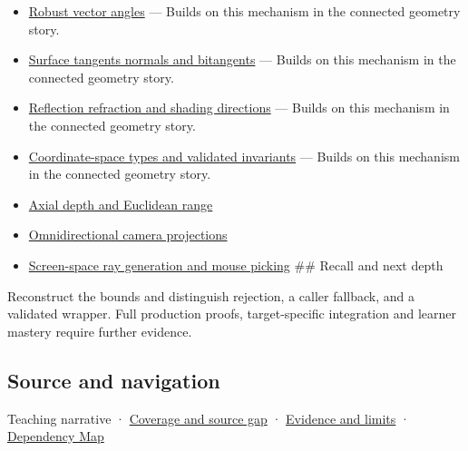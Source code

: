 \begin{itemize}
\item
  \hyperref[appendix-e569e60e18e6]{Robust vector angles} --- Builds on this mechanism in the connected geometry story.
\item
  \hyperref[appendix-e31893dec985]{Surface tangents normals and bitangents} --- Builds on this mechanism in the connected geometry story.
\item
  \hyperref[appendix-44e00863b4d5]{Reflection refraction and shading directions} --- Builds on this mechanism in the connected geometry story.
\item
  \hyperref[appendix-380a220e2529]{Coordinate-space types and validated invariants} --- Builds on this mechanism in the connected geometry story.
\item
  \hyperref[appendix-cac01ebeeb11]{Axial depth and Euclidean range}
\item
  \hyperref[appendix-fc99ad39f351]{Omnidirectional camera projections}
\item
  \hyperref[appendix-f1a6d43e80d1]{Screen-space ray generation and mouse picking} \#\# Recall and next depth
\end{itemize}

Reconstruct the bounds and distinguish rejection, a caller fallback, and a validated wrapper. Full production proofs, target-specific integration and learner mastery require further evidence.

\subsection{Source and navigation}\label{appendix-f744e41b95b4-source-and-navigation}

{Teaching narrative} · \hyperref[appendix-fd090d982a15-phase-6---parts-501-600]{Coverage and source gap} · \hyperref[appendix-a103e7846d21-phase-6---source-analysis-and-verification]{Evidence and limits} · \hyperref[appendix-4ad47bdd269a]{Dependency Map}

